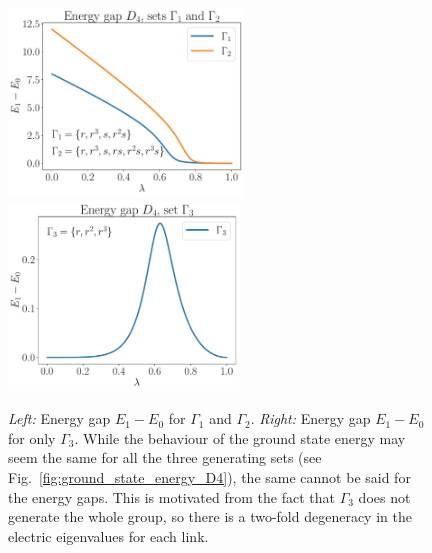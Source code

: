 \begin{figure}[h]
    \centering
    \includegraphics[height=5cm]{assets/graphs/energy_gap_D4_1_2.pdf}
    \hfill%
    \includegraphics[height=5cm]{assets/graphs/energy_gap_D4_3.pdf}%
    \caption[Ground state gap for $D_4$]{
        \emph{Left:} Energy gap $E_1 - E_0$ for $\Gamma_1$ and $\Gamma_2$.
        \emph{Right:} Energy gap $E_1 - E_0$ for only $\Gamma_3$.
        While the behaviour of the ground state energy may seem the same for all the three generating sets (see Fig.~\ref{fig:ground_state_energy_D4}), the same cannot be said for the energy gaps.
        This is motivated from the fact that $\Gamma_3$ does not generate the whole group, so there is a two-fold degeneracy in the electric eigenvalues for each link.
    }%
    \label{fig:energy_gap_D4}
\end{figure}



\clearpage

\vspace*{1cm}

